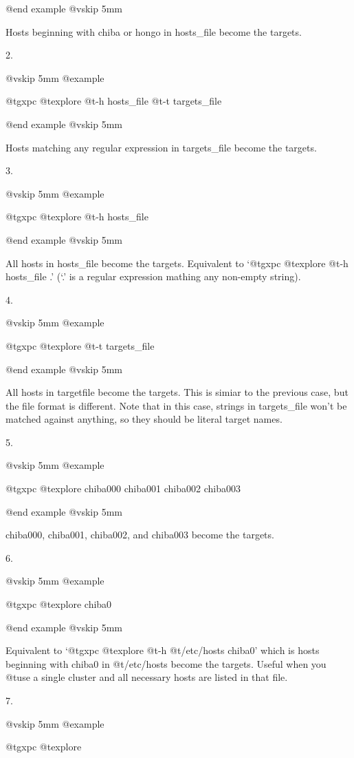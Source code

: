 @end example
@vskip 5mm

Hosts beginning with chiba or hongo in hosts_file 
become the targets.

2.

@vskip 5mm
@example

  @t{gxpc} @t{explore} @t{-h} hosts_file @t{-t} targets_file

@end example
@vskip 5mm

Hosts matching any regular expression in targets_file become
the targets.

3.

@vskip 5mm
@example

  @t{gxpc} @t{explore} @t{-h} hosts_file

@end example
@vskip 5mm

All hosts in hosts_file become the targets.  Equivalent to `@t{gxpc}
@t{explore} @t{-h} hosts_file .'  (`.' is a regular expression mathing
any non-empty string).

4.

@vskip 5mm
@example

  @t{gxpc} @t{explore} @t{-t} targets_file

@end example
@vskip 5mm

All hosts in targetfile become the targets. This is simiar to the
previous case, but the file format is different.  Note that in
this case, strings in targets_file won't be matched against
anything, so they should be literal target names.
     
5.

@vskip 5mm
@example

  @t{gxpc} @t{explore} chiba000 chiba001 chiba002 chiba003

@end example
@vskip 5mm

chiba000, chiba001, chiba002, and chiba003 become the targets.

6.

@vskip 5mm
@example

  @t{gxpc} @t{explore} chiba0

@end example
@vskip 5mm

Equivalent to `@t{gxpc} @t{explore} @t{-h} @t{/etc/hosts} chiba0' which is hosts
beginning with chiba0 in @t{/etc/hosts} become the targets. Useful
when you @t{use} a single cluster and all necessary hosts are listed
in that file.
     
7.

@vskip 5mm
@example

  @t{gxpc} @t{explore}

